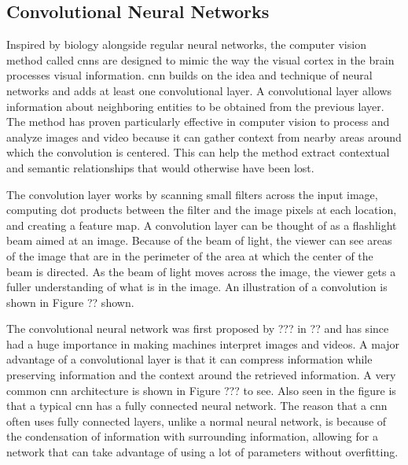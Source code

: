     
    \subsection{Convolutional Neural Networks}

    Inspired by biology alongside regular neural networks, the computer vision method called \glspl{cnn} are designed to mimic the way the visual cortex in the brain processes visual information. \gls{cnn} builds on the idea and technique of neural networks and adds at least one convolutional layer. A convolutional layer allows information about neighboring entities to be obtained from the previous layer. The method has proven particularly effective in computer vision to process and analyze images and video because it can gather context from nearby areas around which the convolution is centered. This can help the method extract contextual and semantic relationships that would otherwise have been lost.

    The convolution layer works by scanning small filters across the input image, computing dot products between the filter and the image pixels at each location, and creating a feature map. A convolution layer can be thought of as a flashlight beam aimed at an image. Because of the beam of light, the viewer can see areas of the image that are in the perimeter of the area at which the center of the beam is directed. As the beam of light moves across the image, the viewer gets a fuller understanding of what is in the image. An illustration of a convolution is shown in Figure ?? shown.

    The convolutional neural network was first proposed by ??? in ?? and has since had a huge importance in making machines interpret images and videos. A major advantage of a convolutional layer is that it can compress information while preserving information and the context around the retrieved information. A very common \gls{cnn} architecture is shown in Figure ??? to see. Also seen in the figure is that a typical \gls{cnn} has a fully connected neural network. The reason that a \gls{cnn} often uses fully connected layers, unlike a normal neural network, is because of the condensation of information with surrounding information, allowing for a network that can take advantage of using a lot of parameters without overfitting.  
    
